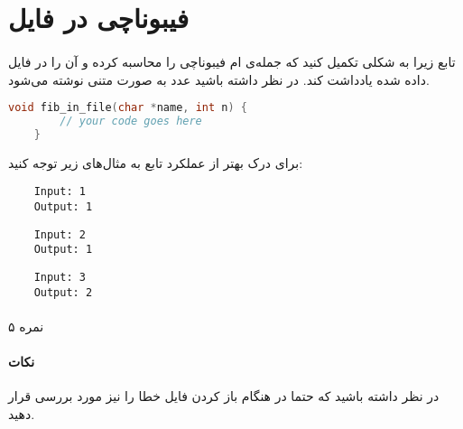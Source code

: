 \documentclass[../main.tex]{subfiles}
\begin{document}
\section{فیبوناچی در فایل}
\paragraph{}
تابع زیرا به شکلی تکمیل کنید 
که جمله‌ی ام فیبوناچی را محاسبه کرده
و آن را در فایل داده شده یادداشت کند.
در نظر داشته باشید عدد به صورت متنی نوشته می‌شود.

\begin{latin}
\begin{lstlisting}[language=c]
    void fib_in_file(char *name, int n) {
        // your code goes here
    }
\end{lstlisting}
\end{latin}

برای درک بهتر از عملکرد تابع به مثال‌های زیر توجه کنید:

\begin{latin}
\begin{verbatim}
    Input: 1
    Output: 1
\end{verbatim}

\begin{verbatim}
    Input: 2
    Output: 1
\end{verbatim}

\begin{verbatim}
    Input: 3
    Output: 2
\end{verbatim}
\end{latin}

\paragraph{}
۵ نمره

\paragraph{نکات}
در نظر داشته باشید که حتما در هنگام باز کردن فایل خطا را نیز مورد بررسی قرار دهید.
\end{document}
